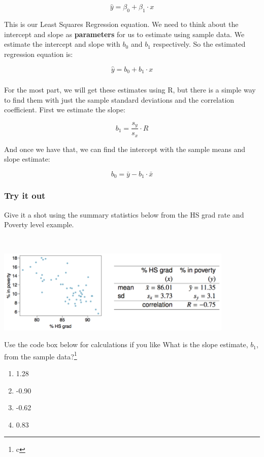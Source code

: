 \documentclass[]{article}
\let\rmarkdownfootnote\footnote%
\def\footnote{\protect\rmarkdownfootnote}
\begin{document}
\[\hat{y}=\beta_0+\beta_1\cdot x\]

This is our Least Squares Regression equation. We need to think about
the intercept and slope as \textbf{parameters} for us to estimate using
sample data. We estimate the intercept and slope with \(b_0\) and
\(b_1\) respectively. So the estimated regression equation is:

\[\hat{y}=b_0+b_1\cdot x\]

\hypertarget{section-3}{%
\subsubsection{\texorpdfstring{\href{}{}}{}}\label{section-3}}

For the most part, we will get these estimates using R, but there is a
simple way to find them with just the sample standard deviations and the
correlation coefficient. First we estimate the slope:

\[b_1=\frac{s_y}{s_x}\cdot R\]

And once we have that, we can find the intercept with the sample means
and slope estimate:

\[b_0=\bar{y}-b_1\cdot \bar{x}\]

\hypertarget{try-it-out}{%
\subsubsection{Try it out}\label{try-it-out}}

Give it a shot using the summary statistics below from the HS grad rate
and Poverty level example.

~

\includegraphics[width=0.85\textwidth,height=\textheight]{images/reg_example.png}

Use the code box below for calculations if you like What is the slope
estimate, \(b_1\), from the sample data?\footnote{c}

\begin{enumerate}
\def\labelenumi{\alph{enumi})}
\item
  1.28
\item
  -0.90
\item
  -0.62
\item
  0.83
\end{enumerate}
\end{document}
